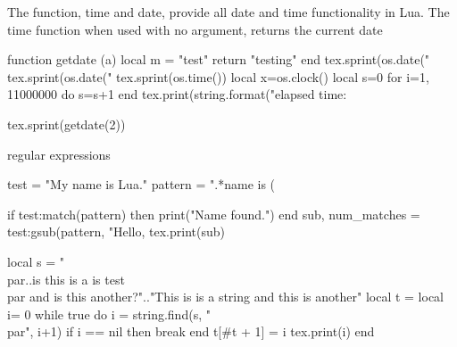 \documentclass{article}
\begin{document}

The function, time and date, provide all date and time functionality in Lua. The time function when used with no argument, returns the current date  

\begin{luacode*}
function getdate (a)
  local m = "test"
  return "testing"
end
tex.sprint(os.date("%
tex.sprint(os.date("%
tex.sprint(os.time())
local x=os.clock()
local s=0
for i=1, 11000000 do s=s+1 end
tex.print(string.format("elapsed time: %

tex.sprint(getdate(2))
\end{luacode*}

\the\luatexversion

 \luatexdatestamp 

\formatname

regular expressions

\begin{luacode*}
test = "My name is Lua."
pattern = ".*name is (%
 
if test:match(pattern) then
    print("Name found.")
end
sub, num_matches = test:gsub(pattern, "Hello, %
tex.print(sub)
\end{luacode*} 

\edef\tempstring{\string\\par..is this is a is test \string\\par and is this another?}
\begin{luacode}
local s = "\tempstring".."This is is a string and this is another"
local t = {}
local i= 0
while true do
    i = string.find(s, "\\par", i+1)
    if i == nil then break end
    t[#t + 1] = i
    tex.print(i)
end
   
\end{luacode}
\end{document}
